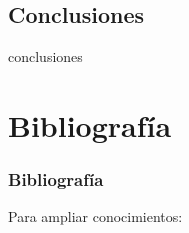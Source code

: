 \documentclass[12pt]{beamer}
\begin{document}
\subsection{Conclusiones}
\begin{frame}
	conclusiones
\end{frame}

\section{Bibliografía}
\begin{frame}[allowframebreaks]
	\frametitle{Bibliografía}
	
	Para ampliar conocimientos: \nocite{chuvieco2002teledeteccion,schowengerdt2006}
	
	
\end{frame}
\end{document}
